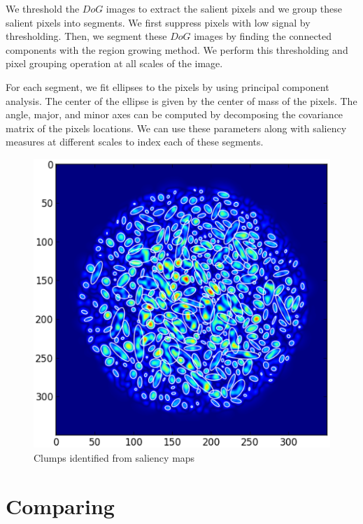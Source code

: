 We threshold the $DoG$ images to extract the salient pixels and we
group these salient pixels into segments.  We first suppress pixels
with low signal by thresholding.  Then, we segment these $DoG$ images
by finding the connected components with the region growing method.
We perform this thresholding and pixel grouping operation at all
scales of the image.

For each segment, we fit ellipses to the pixels by using principal
component analysis.  The center of the ellipse is given by the center
of mass of the pixels.  The angle, major, and minor axes can be
computed by decomposing the covariance matrix of the pixels locations.
We can use these parameters along with saliency measures at different
scales to index each of these segments.

\begin{figure}[ht!]
\centering
\includegraphics[scale=0.5]{part9/Teuben_P059/s3-ell-0.eps}
\caption{Clumps identified from saliency maps}
\label{fig:teuben1}
\end{figure}

% 

\section{Comparing}

